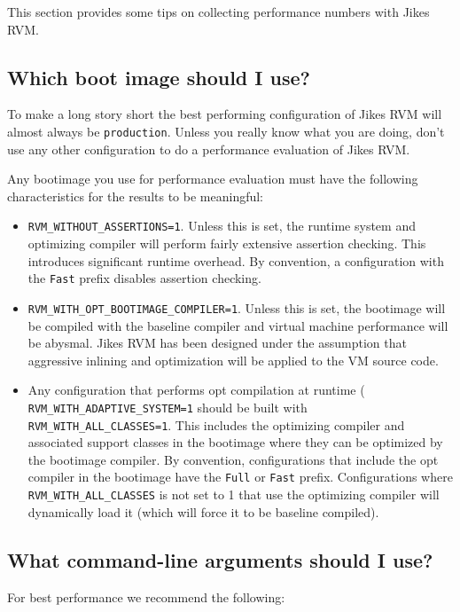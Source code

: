 This section provides some tips on collecting performance numbers with
Jikes RVM.

\subsection{Which boot image should I use?}

To make a long story short the best performing configuration of Jikes
RVM will almost always be {\tt production}.  Unless you really know
what you are doing, don't use any other configuration to do a
performance evaluation of Jikes RVM. 

Any bootimage you use for performance evaluation must have the
following characteristics for the results to be meaningful:
\begin{itemize} 
\item {\tt RVM\_WITHOUT\_ASSERTIONS=1}. Unless this is set, the runtime
system and optimizing compiler will perform fairly extensive assertion
checking. This introduces significant runtime overhead. By convention,
a configuration with the {\tt Fast} prefix disables assertion
checking.
\item {\tt RVM\_WITH\_OPT\_BOOTIMAGE\_COMPILER=1}. Unless this is set, the
bootimage will be compiled with the baseline compiler and virtual
machine performance will be abysmal.  Jikes RVM has been designed
under the assumption that aggressive inlining and optimization will be
applied to the VM source code. 
\item Any configuration that performs opt compilation at runtime (
{\tt RVM\_WITH\_ADAPTIVE\_SYSTEM=1} should be built with {\tt
RVM\_WITH\_ALL\_CLASSES=1}.  This includes the optimizing compiler and
associated support classes in the bootimage where they can be
optimized by the bootimage compiler. By convention, configurations
that include the opt compiler in the bootimage have the {\tt Full} or
{\tt Fast} prefix.  Configurations where {\tt RVM\_WITH\_ALL\_CLASSES}
is not set to 1 that use the optimizing compiler will dynamically load
it (which will force it to be baseline compiled).
\end{itemize}

\subsection{What command-line arguments should I use?}

For best performance we recommend the following:

